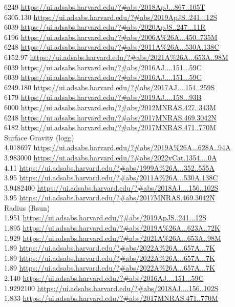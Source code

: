 6249 \url{https://ui.adsabs.harvard.edu/?#abs/2018ApJ...867..105T}\\
6305.130 \url{https://ui.adsabs.harvard.edu/?#abs/2019ApJS..241...12S}\\
6039 \url{https://ui.adsabs.harvard.edu/?#abs/2020ApJS..247...11R}\\
6196 \url{https://ui.adsabs.harvard.edu/?#abs/2006A%26A...450..735M}\\
6248 \url{https://ui.adsabs.harvard.edu/?#abs/2011A%26A...530A.138C}\\
6152.97 \url{https://ui.adsabs.harvard.edu/?#abs/2021A%26A...653A..98M}\\
6039 \url{https://ui.adsabs.harvard.edu/?#abs/2016AJ....151...59C}\\
6039 \url{https://ui.adsabs.harvard.edu/?#abs/2016AJ....151...59C}\\
6249.180 \url{https://ui.adsabs.harvard.edu/?#abs/2017AJ....154..259S}\\
6179 \url{https://ui.adsabs.harvard.edu/?#abs/2019AJ....158...93B}\\
6000 \url{https://ui.adsabs.harvard.edu/?#abs/2012MNRAS.427..343M}\\
6248 \url{https://ui.adsabs.harvard.edu/?#abs/2017MNRAS.469.3042N}\\
6182 \url{https://ui.adsabs.harvard.edu/?#abs/2017MNRAS.471..770M}\\
Surface Gravity (logg)\\ 
4.018697 \url{https://ui.adsabs.harvard.edu/?#abs/2019A%26A...628A..94A}\\
3.983000 \url{https://ui.adsabs.harvard.edu/?#abs/2022yCat.1354....0A}\\
4.11 \url{https://ui.adsabs.harvard.edu/?#abs/1999A%26A...352..555A}\\
3.95 \url{https://ui.adsabs.harvard.edu/?#abs/2011A%26A...530A.138C}\\
3.9482400 \url{https://ui.adsabs.harvard.edu/?#abs/2018AJ....156..102S}\\
3.95 \url{https://ui.adsabs.harvard.edu/?#abs/2017MNRAS.469.3042N}\\
Radius (Rsun)\\
1.951 \url{https://ui.adsabs.harvard.edu/?#abs/2019ApJS..241...12S}\\
1.895 \url{https://ui.adsabs.harvard.edu/?#abs/2019A%26A...623A..72K}\\
1.929 \url{https://ui.adsabs.harvard.edu/?#abs/2021A%26A...653A..98M}\\
1.89 \url{https://ui.adsabs.harvard.edu/?#abs/2022A%26A...657A...7K}\\
1.89 \url{https://ui.adsabs.harvard.edu/?#abs/2022A%26A...657A...7K}\\
1.89  \url{https://ui.adsabs.harvard.edu/?#abs/2022A%26A...657A...7K}\\
2.140 \url{https://ui.adsabs.harvard.edu/?#abs/2016AJ....151...59C}\\
1.9292100 \url{https://ui.adsabs.harvard.edu/?#abs/2018AJ....156..102S}\\
1.833 \url{https://ui.adsabs.harvard.edu/?#abs/2017MNRAS.471..770M}\\


